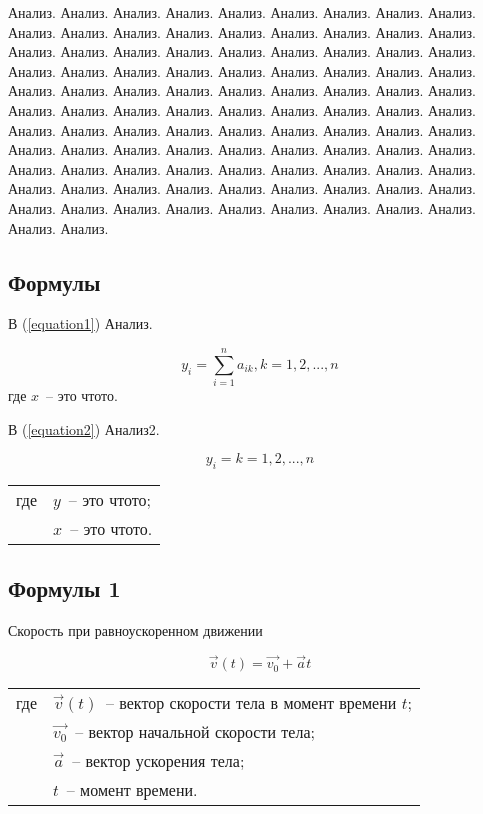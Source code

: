 Анализ. Анализ. Анализ. Анализ. Анализ.
Анализ. Анализ. Анализ. Анализ. Анализ. Анализ. Анализ. Анализ. Анализ. Анализ. Анализ.
Анализ. Анализ. Анализ. Анализ. Анализ.
Анализ. Анализ. Анализ. Анализ. Анализ. Анализ. Анализ. Анализ. Анализ. Анализ. Анализ.
Анализ. Анализ. Анализ. Анализ. Анализ.
Анализ. Анализ. Анализ. Анализ. Анализ. Анализ. Анализ. Анализ. Анализ. Анализ. Анализ.
Анализ. Анализ. Анализ. Анализ. Анализ.
Анализ. Анализ. Анализ. Анализ. Анализ. Анализ. Анализ. Анализ. Анализ. Анализ. Анализ.
Анализ. Анализ. Анализ. Анализ. Анализ.
Анализ. Анализ. Анализ. Анализ. Анализ. Анализ. Анализ. Анализ. Анализ. Анализ. Анализ.
Анализ. Анализ. Анализ. Анализ. Анализ.
Анализ. Анализ. Анализ. Анализ. Анализ. Анализ. Анализ. Анализ. Анализ. Анализ. Анализ.
Анализ. Анализ. Анализ. Анализ. Анализ.

\subsection{Формулы}

В (\ref{equation1}) Анализ.

\begin{equation}\label{equation1}
  y_i = \sum_{i=1}^{n} a_{ik}, k = 1,2,...,n
\end{equation}
где \(x\)~-- это чтото.

В (\ref{equation2}) Анализ2.

\begin{equation}\label{equation2}
  y_i = k = 1,2,...,n
\end{equation}
\begin{tabular}{rl}
  где & \(y\)~-- это чтото; \\
      & \(x\)~-- это чтото.
\end{tabular}

\subsection{Формулы 1}

Скорость при равноускоренном движении

\begin{equation}
  \vec{v}(t) = \vec{v_0} + \vec{a}t
\end{equation}
\hspace{-4mm}
\begin{tabular}{rl}
  где \hspace{-4mm} & \(\vec{v}(t)\)~-- вектор скорости тела в момент времени \(t\);  \\
                    & \(\vec{v_0}\)~-- вектор начальной скорости тела;             \\
                    & \(\vec{a}\)~-- вектор ускорения тела; \\
                    & \(t\)~-- момент времени.
\end{tabular}

